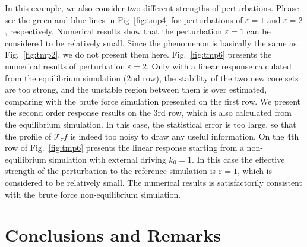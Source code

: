\documentclass[aip,jcp,a4paper,reprint,onecolumn]{revtex4-1}
\newcommand{\eps}{\varepsilon}
\newcommand{\mt}{\mathcal T}
\begin{document}
In this example, we also consider two different strengths of
perturbations. Please see the green and blue lines in Fig~\ref{fig:tmp4} for
perturbations of $\eps = 1$ and $\eps = 2$, respectively.
Numerical results show that the perturbation $\eps=1$ can be considered to be
relatively small. Since the phenomenon is basically the same as
Fig.~\ref{fig:tmp2}, we do not present them here.
Fig.~\ref{fig:tmp6} presents the numerical results of perturbation $\eps =
2$.  Only with a linear response calculated from the equilibrium
simulation (2nd row), the stability of the two new core sets are too
strong, and the unstable region between them is over estimated, comparing with
the brute force simulation presented on the first row.
We present the  second order response results on the 3rd row, which is
also calculated from the equilibrium simulation. In this case, the statistical
error is too large, so that
the profile of $\mt_\tau f$ is indeed too noisy to draw any useful information.
On the 4th row of Fig.~\ref{fig:tmp6} presents the linear response starting
from a non-equilibrium simulation with external driving $k_0 = 1$.
In this case the effective strength of the perturbation to the reference
simulation is $\eps = 1$, which is considered to be relatively small.
The numerical results is satisfactorily consistent with the brute force
non-equilibrium simulation.



\section{Conclusions and Remarks}
\end{document}
